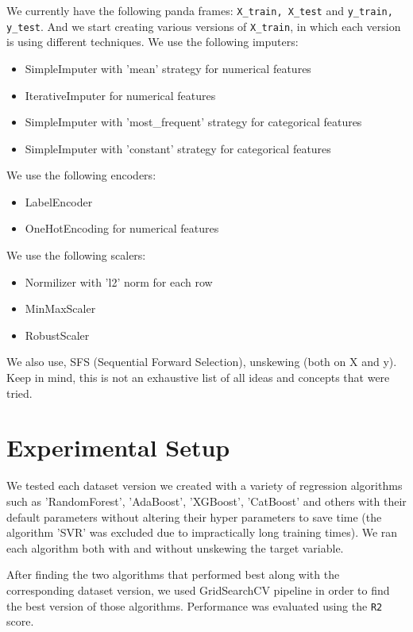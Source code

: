 \documentclass[conference]{IEEEtran}
\begin{document}
We currently have the following panda frames: \texttt{X\_train, X\_test} and
\texttt{y\_train, y\_test}. And we start creating various versions of
\texttt{X\_train}, in which each version is using different techniques. We use 
the following imputers:
\begin{itemize}
        \item SimpleImputer with 'mean' strategy for numerical features
        \item IterativeImputer for numerical features
        \item SimpleImputer with 'most\_frequent' strategy for categorical
                features
        \item SimpleImputer with 'constant' strategy for categorical
                features
\end{itemize}
We use the following encoders:
\begin{itemize}
        \item LabelEncoder
        \item OneHotEncoding for numerical features
\end{itemize}

We use the following scalers:
\begin{itemize}
        \item Normilizer with 'l2' norm for each row
        \item MinMaxScaler
        \item RobustScaler
\end{itemize}

We also use, SFS (Sequential Forward Selection), unskewing (both on X and y).
Keep in mind, this is not an exhaustive list of all ideas and concepts that
were tried.


\section{Experimental Setup}
We tested each dataset version we created with a variety of regression
algorithms such as 'RandomForest', 'AdaBoost', 'XGBoost', 'CatBoost' and others
with their default parameters without altering their hyper parameters to save
time (the algorithm 'SVR' was excluded due to impractically long training
times). We ran each algorithm both with and without unskewing the target
variable.

After finding the two algorithms that performed best along with the
corresponding dataset version, we used GridSearchCV pipeline in order to find
the best version of those algorithms. Performance was evaluated using the
\texttt{R2} score.
\end{document}

